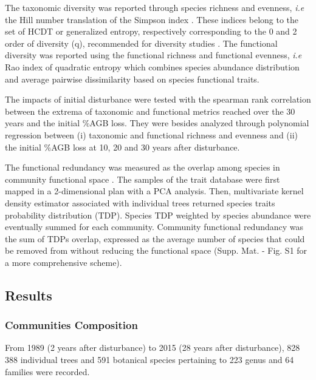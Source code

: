 \documentclass[
  11pt,
  french,
  A4paper,
  extrafontsizes,onecolumn,openright
  ]{memoir}
\begin{document}
The taxonomic diversity was reported through species richness and
evenness, \emph{i.e} the Hill number translation of the Simpson index
\autocite{Hill1973}. These indices belong to the set of HCDT or
generalized entropy, respectively corresponding to the 0 and 2 order of
diversity (q), recommended for diversity studies \autocite{Marcon2015b}.
The functional diversity was reported using the functional richness and
functional evenness, \emph{i.e} Rao index of quadratic entropy which
combines species abundance distribution and average pairwise
dissimilarity based on species functional traits.

The impacts of initial disturbance were tested with the spearman rank
correlation between the extrema of taxonomic and functional metrics
reached over the 30 years and the initial \%AGB loss. They were besides
analyzed through polynomial regression between (i) taxonomic and
functional richness and evenness and (ii) the initial \%AGB loss at 10,
20 and 30 years after disturbance.

The functional redundancy was measured as the overlap among species in
community functional space \autocite{Carmona2016}. The samples of the
trait database were first mapped in a 2-dimensional plan with a PCA
analysis. Then, multivariate kernel density estimator associated with
individual trees returned species traits probability distribution (TDP).
Species TDP weighted by species abundance were eventually summed for
each community. Community functional redundancy was the sum of TDPs
overlap, expressed as the average number of species that could be
removed from without reducing the functional space (Supp. Mat. - Fig. S1
for a more comprehensive scheme).

\subsection{Results}\label{results-1}

\subsubsection{Communities Composition}\label{communities-composition}

From 1989 (2 years after disturbance) to 2015 (28 years after
disturbance), 828 388 individual trees and 591 botanical species
pertaining to 223 genus and 64 families were recorded.
\end{document}

